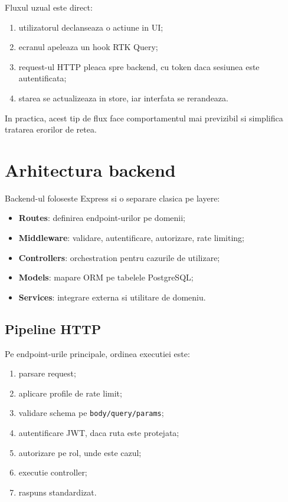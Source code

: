 Fluxul uzual este direct:
\begin{enumerate}[leftmargin=1.2cm]
    \item utilizatorul declanseaza o actiune in UI;
    \item ecranul apeleaza un hook RTK Query;
    \item request-ul HTTP pleaca spre backend, cu token daca sesiunea este autentificata;
    \item starea se actualizeaza in store, iar interfata se rerandeaza.
\end{enumerate}

In practica, acest tip de flux face comportamentul mai previzibil si simplifica tratarea erorilor de retea.

\section{Arhitectura backend}

Backend-ul foloseste Express si o separare clasica pe layere:
\begin{itemize}[leftmargin=1.2cm]
    \item \textbf{Routes}: definirea endpoint-urilor pe domenii;
    \item \textbf{Middleware}: validare, autentificare, autorizare, rate limiting;
    \item \textbf{Controllers}: orchestration pentru cazurile de utilizare;
    \item \textbf{Models}: mapare ORM pe tabelele PostgreSQL;
    \item \textbf{Services}: integrare externa si utilitare de domeniu.
\end{itemize}

\subsection{Pipeline HTTP}

Pe endpoint-urile principale, ordinea executiei este:
\begin{enumerate}[leftmargin=1.2cm]
    \item parsare request;
    \item aplicare profile de rate limit;
    \item validare schema pe \texttt{body/query/params};
    \item autentificare JWT, daca ruta este protejata;
    \item autorizare pe rol, unde este cazul;
    \item executie controller;
    \item raspuns standardizat.
\end{enumerate}

